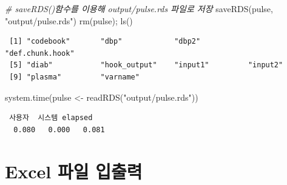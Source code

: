 \documentclass[
  11pt,
]{krantz}
\newenvironment{Shaded}{\begin{snugshade}}{\end{snugshade}}
\newcommand{\CommentTok}[1]{\textcolor[rgb]{0.37,0.37,0.37}{\textit{#1}}}
\newcommand{\FunctionTok}[1]{\textcolor[rgb]{0,0,0}{#1}}
\newcommand{\NormalTok}[1]{#1}
\newcommand{\OtherTok}[1]{\textcolor[rgb]{0.37,0.37,0.37}{#1}}
\newcommand{\StringTok}[1]{\textcolor[rgb]{0.5,0.5,0.5}{#1}}
\begin{document}
\begin{Shaded}
\begin{Highlighting}[]
\CommentTok{\# saveRDS()함수를 이용해 output/pulse.rds 파일로 저장}
\FunctionTok{saveRDS}\NormalTok{(pulse, }\StringTok{"output/pulse.rds"}\NormalTok{)}
\FunctionTok{rm}\NormalTok{(pulse); }\FunctionTok{ls}\NormalTok{()}
\end{Highlighting}
\end{Shaded}

\begin{verbatim}
 [1] "codebook"       "dbp"            "dbp2"           "def.chunk.hook"
 [5] "diab"           "hook_output"    "input1"         "input2"        
 [9] "plasma"         "varname"       
\end{verbatim}

\begin{Shaded}
\begin{Highlighting}[]
\FunctionTok{system.time}\NormalTok{(pulse }\OtherTok{\textless{}{-}} \FunctionTok{readRDS}\NormalTok{(}\StringTok{"output/pulse.rds"}\NormalTok{))}
\end{Highlighting}
\end{Shaded}

\begin{verbatim}
 사용자  시스템 elapsed 
  0.080   0.000   0.081 
\end{verbatim}

\normalsize

\hypertarget{import-export-excel}{%
\section{Excel 파일 입출력}\label{import-export-excel}}
\end{document}
